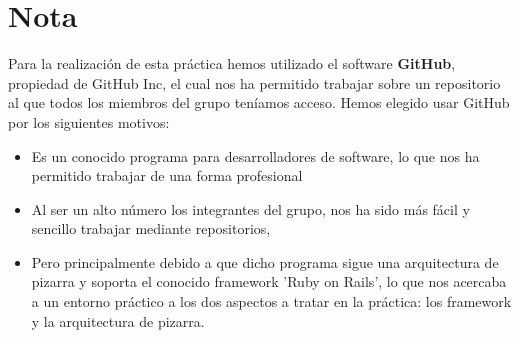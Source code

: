 \chapter [GitHub]{Nota}
Para la realización de esta práctica hemos utilizado el software {\bf GitHub}, propiedad de 	GitHub Inc, el cual nos ha permitido trabajar sobre un repositorio al que todos los miembros del grupo teníamos acceso. Hemos elegido usar GitHub por los siguientes motivos:
\begin{itemize}
	\item Es un conocido programa para desarrolladores de software, lo que nos ha permitido trabajar de una forma profesional
	\item Al ser un alto número los integrantes del grupo, nos ha sido más fácil y sencillo trabajar mediante repositorios, 
	\item Pero principalmente debido a que dicho programa sigue una arquitectura de pizarra y soporta el conocido framework 'Ruby on Rails', lo que nos acercaba a un entorno práctico a los dos aspectos a tratar en la práctica: los framework y la arquitectura de pizarra.
\end{itemize}
